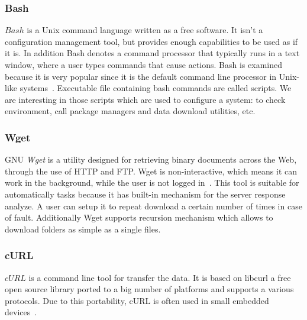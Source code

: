 \subsubsection*{Bash} \label{lang:bash}
$Bash$ is a Unix command language written as a free software.
It isn't a configuration management tool, but provides enough capabilities to be used as if it is.
In addition Bash denotes a command processor that typically runs in a text window, where a user types commands that cause actions.
Bash is examined because it is very popular since it is the default command line processor in Unix-like systems~\cite*{bashdef}.
Executable file containing bash commands are called scripts.
We are interesting in those scripts which are used to configure a system: to check environment, call package managers and data download utilities, etc.

\subsubsection*{Wget}
GNU \emph{Wget} is a utility designed for retrieving binary documents across the Web, through the use of HTTP and FTP.
Wget is non-interactive, which means it can work in the background, while the user is not logged in~\cite{wget_desc}.
This tool is suitable for automatically  tasks because it has built-in mechanism for the server response analyze.
A user can setup it to repeat download a certain number of times in case of fault.
Additionally Wget supports recursion mechanism which allows to download folders as simple as a single files.
\subsubsection*{cURL}
$cURL$ is a command line tool for transfer the data.
 It is based on libcurl a free open source library ported to a big number of platforms and supports a various protocols.
Due to this portability, cURL is often used in small embedded devices~\cite{curl}.
